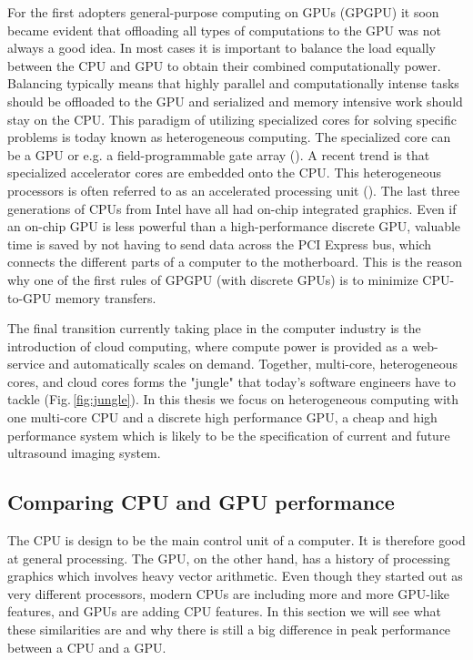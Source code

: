 For the first adopters general-purpose computing on GPUs (GPGPU) it soon became evident that offloading all types of computations to the GPU was not always a good idea. In most cases it is important to balance the load equally between the CPU and GPU to obtain their combined computationally power. Balancing typically means that highly parallel and computationally intense tasks should be offloaded to the GPU and serialized and memory intensive work should stay on the CPU. This paradigm of utilizing specialized cores for solving specific problems is today known as heterogeneous computing. The specialized core can be a GPU or e.g. a field-programmable gate array (). A recent trend is that specialized accelerator cores are embedded onto the CPU. This heterogeneous processors is often referred to as an accelerated processing unit (). The last three generations of CPUs from Intel have all had on-chip integrated graphics. Even if an on-chip GPU is less powerful than a high-performance discrete GPU, valuable time is saved by not having to send data across the PCI Express bus, which connects the different parts of a computer to the motherboard. This is the reason why one of the first rules of GPGPU (with discrete GPUs) is to minimize CPU-to-GPU memory transfers. 

The final transition currently taking place in the computer industry is the introduction of cloud computing, where compute power is provided as a web-service and automatically scales on demand. Together, multi-core, heterogeneous cores, and cloud cores forms the "jungle" that today's software engineers have to tackle (Fig.\,\ref{fig:jungle}). In this thesis we focus on heterogeneous computing with one multi-core CPU and a discrete high performance GPU, a cheap and high performance system which is likely to be the specification of current and future ultrasound imaging system.

\subsection{Comparing CPU and GPU performance}\label{sec:cpu_vs_gpu}
The CPU is design to be the main control unit of a computer. It is therefore good at general processing. The GPU, on the other hand, has a history of processing graphics which involves heavy vector arithmetic. Even though they started out as very different processors, modern CPUs are including more and more GPU-like features, and GPUs are adding CPU features. In this section we will see what these similarities are and why there is still a big difference in peak performance between a CPU and a GPU.

